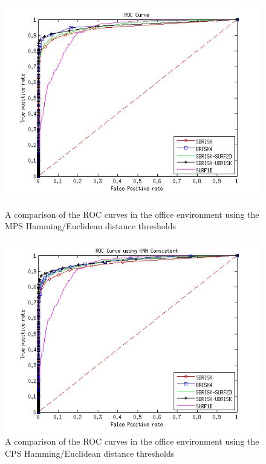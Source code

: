 \documentclass{report}
\begin{document}
\begin{figure}[h!]
\begin{minipage}[b]{0.5\linewidth}
\includegraphics[scale=0.4]{../Drawings/dataset2_ROC_General_Hamming.jpg}
\caption{A comparison of the ROC curves in the office environment using the MPS Hamming/Euclidean distance thresholds}
\label{fig:compareHammingOffice}
\end{minipage}
\hspace{0.5cm}
\begin{minipage}[b]{0.5\linewidth}
\includegraphics[scale=0.4]{../Drawings/dataset2_ROC_General_Hamming_Consistent.jpg}
\caption{A comparison of the ROC curves in the office environment using the CPS Hamming/Euclidean distance thresholds}
\label{fig:compareHammingConsistentOffice}
\end{minipage}
\end{figure}
\end{document}
